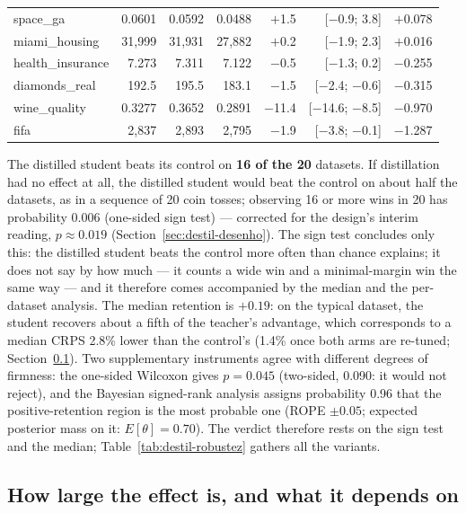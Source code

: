 \begin{table}[htbp]
\begin{tabular}{lrrrrrr}
space\_ga & 0.0601 & 0.0592 & 0.0488 & $+$1.5 & [$-$0.9; 3.8] & $+$0.078 \\
miami\_housing & 31{,}999 & 31{,}931 & 27{,}882 & $+$0.2 & [$-$1.9; 2.3] & $+$0.016 \\
health\_insurance & 7.273 & 7.311 & 7.122 & $-$0.5 & [$-$1.3; 0.2] & $-$0.255 \\
diamonds\_real & 192.5 & 195.5 & 183.1 & $-$1.5 & [$-$2.4; $-$0.6] & $-$0.315 \\
wine\_quality & 0.3277 & 0.3652 & 0.2891 & $-$11.4 & [$-$14.6; $-$8.5] & $-$0.970 \\
fifa & 2{,}837 & 2{,}893 & 2{,}795 & $-$1.9 & [$-$3.8; $-$0.1] & $-$1.287 \\
\bottomrule
\end{tabular}
\end{table}

The distilled student beats its control on \textbf{16 of the 20}
datasets. If distillation had no effect at all, the distilled
student would beat the control on about half the datasets, as in a
sequence of 20 coin tosses; observing 16 or more wins in 20 has
probability 0.006 (one-sided sign test) --- corrected for the
design's interim reading, $p \approx 0.019$
(Section~\ref{sec:destil-desenho}). The sign test concludes only
this: the distilled student beats the control more often than
chance explains; it does not say by how much --- it counts a wide
win and a minimal-margin win the same way --- and it therefore comes
accompanied by the median and the per-dataset analysis. The median
retention is $+0.19$: on the typical dataset, the student recovers
about a fifth of the teacher's advantage, which corresponds to a
median CRPS 2.8\% lower than the control's (1.4\% once both arms are
re-tuned; Section~\ref{sec:destil-retune}). Two supplementary
instruments agree with different degrees of firmness: the one-sided
Wilcoxon gives $p=0.045$ (two-sided, 0.090: it would not reject),
and the Bayesian signed-rank analysis \citep{benavoli2017} assigns
probability 0.96 that the positive-retention region is the most
probable one (ROPE $\pm0.05$; expected posterior mass on it:
$E[\theta]=0.70$). The verdict therefore
rests on the sign test and the median;
Table~\ref{tab:destil-robustez} gathers all the variants.

\subsection{How large the effect is, and what it depends on}
\label{sec:destil-retune}


